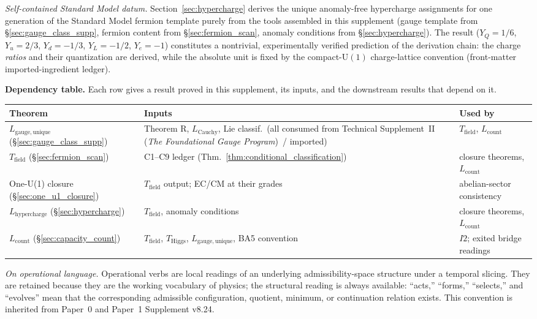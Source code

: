 \documentclass[11pt]{article}
\theoremstyle{definition}
\newcommand{\U}{\mathrm{U}}
\newcommand{\TSII}{Technical Supplement~II (\emph{The Foundational Gauge Program})}
\begin{document}
\medskip
\smallskip\noindent\textit{Self-contained Standard Model datum.}\quad
Section~\ref{sec:hypercharge} derives the unique anomaly-free hypercharge
assignments for one generation of the Standard Model fermion template
purely from the tools assembled in this supplement (gauge template from
\S\ref{sec:gauge_class_supp}, fermion content from \S\ref{sec:fermion_scan},
anomaly conditions from \S\ref{sec:hypercharge}).  The result
($Y_Q = 1/6$, $Y_u = 2/3$, $Y_d = -1/3$, $Y_L = -1/2$, $Y_e = -1$)
constitutes a nontrivial, experimentally verified prediction of the
derivation chain: the charge \emph{ratios} and their quantization are
derived, while the absolute unit is fixed by the compact-$\U(1)$
charge-lattice convention (front-matter imported-ingredient ledger).



\medskip\noindent\textbf{Dependency table.}  Each row gives a result proved in this supplement, its inputs, and the downstream results that depend on it.

\smallskip
\begin{center}\footnotesize
\renewcommand{\arraystretch}{1.15}
\begin{tabular}{@{}lp{4.9cm}p{4.3cm}@{}}
\toprule
\textbf{Theorem} & \textbf{Inputs} & \textbf{Used by} \\
\midrule
$L_{\mathrm{gauge,unique}}$ (\S\ref{sec:gauge_class_supp}) & Theorem R, $L_{\mathrm{Cauchy}}$, Lie classif.\ (all consumed from \TSII\ / imported) & $T_{\mathrm{field}}$, $L_{\mathrm{count}}$ \\
$T_{\mathrm{field}}$ (\S\ref{sec:fermion_scan}) & C1--C9 ledger (Thm.~\ref{thm:conditional_classification}) & closure theorems, $L_{\mathrm{count}}$ \\
One-U(1) closure (\S\ref{sec:one_u1_closure}) & $T_{\mathrm{field}}$ output; EC/CM at their grades & abelian-sector consistency \\
$L_{\mathrm{hypercharge}}$ (\S\ref{sec:hypercharge}) & $T_{\mathrm{field}}$, anomaly conditions & closure theorems, $L_{\mathrm{count}}$ \\
$L_{\mathrm{count}}$ (\S\ref{sec:capacity_count}) & $T_{\mathrm{field}}$, $T_{\mathrm{Higgs}}$, $L_{\mathrm{gauge,unique}}$, BA5 convention & $I2$; exited bridge readings \\
\bottomrule
\end{tabular}
\end{center}

\tableofcontents

\medskip
\noindent\textit{On operational language.}\quad
Operational verbs are local readings of an underlying admissibility-space
structure under a temporal slicing.  They are retained because they are the
working vocabulary of physics; the structural reading is always available:
``acts,'' ``forms,'' ``selects,'' and ``evolves'' mean that the corresponding
admissible configuration, quotient, minimum, or continuation relation exists.
This convention is inherited from Paper~0 and Paper~1 Supplement v8.24.
\end{document}
